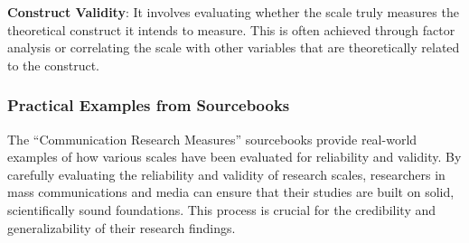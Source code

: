 \documentclass[
]{book}
\begin{document}
\textbf{Construct Validity}: It involves evaluating whether the scale truly measures the theoretical construct it intends to measure. This is often achieved through factor analysis or correlating the scale with other variables that are theoretically related to the construct.

\hypertarget{practical-examples-from-sourcebooks}{%
\subsubsection*{Practical Examples from Sourcebooks}\label{practical-examples-from-sourcebooks}}

The ``Communication Research Measures'' sourcebooks provide real-world examples of how various scales have been evaluated for reliability and validity. By carefully evaluating the reliability and validity of research scales, researchers in mass communications and media can ensure that their studies are built on solid, scientifically sound foundations. This process is crucial for the credibility and generalizability of their research findings.
\end{document}

